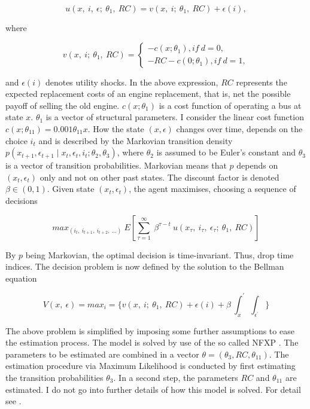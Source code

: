 \begin{equation}
u(x,\ i,\ \epsilon;\ \theta_1,\ RC)=v(x,\ i;\ \theta_1,\ RC)+\epsilon(i),
\end{equation}

where

\begin{equation*}
v(x,\ i;\ \theta_1,\ RC)=
\begin{cases}
-c(x; \theta_1), if\ d=0,\\
-RC-c(0;\theta_1), if\ d=1,
\end{cases}
\end{equation*}

\noindent and $\epsilon(i)$ denotes utility shocks. In the above expression, $RC$ represents the expected replacement costs of an engine replacement, that is, net the possible payoff of selling the old engine. $c(x; \theta_1)$ is a cost function of operating a bus at state $x$. $\theta_1$ is a vector of structural parameters. I consider the linear cost function $c(x; \theta_{11}) = 0.001 \theta_{11} x$.
How the state $(x, \epsilon)$ changes over time, depends on the choice $i_t$ and is described by the Markovian transition density $p(x_{t+1}, \epsilon_{t+1} \mid x_t, \epsilon_t, i_t; \theta_2, \theta_3)$, where $\theta_2$ is assumed to be Euler’s constant and $\theta_3$ is a vector of transition probabilities. Markovian means that $p$ depends on $ (x_t, \epsilon_t) $ only and not on other past states.
The discount factor is denoted $\beta \in (0,1) $. Given state $ (x_t, \epsilon_t) $, the agent maximises, choosing a sequence of decisions

\begin{equation}
max_{(i_t,\ i_{t+1},\ i_{t+2},\ ...)}\ E[\sum_{\tau=1}^\infty\ \beta^{\tau-t}\ u(x_{\tau},\ i_{\tau},\ \epsilon_{\tau};\ \theta_1,\ RC)]
\end{equation}

By $p$ being Markovian, the optimal decision is time-invariant. Thus, drop time indices. The decision problem is now defined by the solution to the Bellman equation

\begin{equation}
V(x,\ \epsilon)=max_i=\{v(x,\ i;\ \theta_1,\ RC)+\epsilon(i)+\beta\ \int_x^{\prime}\ \int_{\epsilon^{\prime}}\}
\end{equation}

The above problem is simplified by imposing some further assumptions to ease the estimation process. The model is solved by use of the so called NFXP \cite{R87}. The parameters to be estimated are combined in a vector $\theta=(\theta_3, RC, \theta_{11}) $. The estimation procedure via Maximum Likelihood is conducted by first estimating the transition probabilities $\theta_3$. In a second step, the parameters $RC$ and $\theta_{11}$ are estimated. I do not go into further details of how this model is solved. For detail see \cite{R87}.

